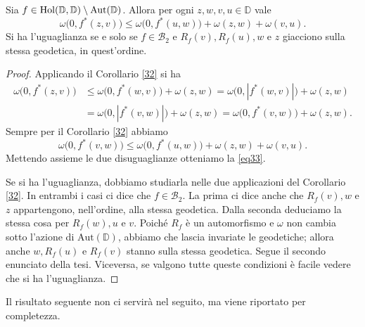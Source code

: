 \begin{cor} \label{33}
  Sia $f \in \text{\normalfont{Hol}}(\mathbb{D},\mathbb{D})\setminus\text{\normalfont{Aut}}(\mathbb{D})$. Allora per ogni $z, w, v, u \in \mathbb{D}$ vale
  \begin{equation} \label{eq33}
    \omega\bigl(0, f^*(z,v)\bigr) \le \omega\bigl(0, f^*(u,w)\bigr)+\omega(z,w)+\omega(v,u).
  \end{equation}
  Si ha l'uguaglianza se e solo se $f \in \mathcal{B}_2$ e $R_f(v), R_f(u), w$ e $z$ giacciono sulla stessa geodetica, in quest'ordine.
\end{cor}
\begin{proof}
  Applicando il Corollario \ref{32} si ha
  \begin{align*}
    \omega\bigl(0,f^*(z,v)\bigr) & \le \omega\bigl(0,f^*(w,v)\bigr)+\omega(z,w) =\omega\bigl(0,|f^*(w,v)|\bigr)+\omega(z,w) \\
    & =\omega\bigl(0,|f^*(v,w)|\bigr)+\omega(z,w)=\omega\bigl(0,f^*(v,w)\bigr)+\omega(z,w).
  \end{align*}
  Sempre per il Corollario \ref{32} abbiamo
  $$\omega\bigl(0,f^*(v,w)\bigr) \le \omega\bigl(0,f^*(u,w)\bigr)+\omega(z,w)+\omega(v,u).$$
  Mettendo assieme le due disuguaglianze otteniamo la \eqref{eq33}.

  Se si ha l'uguaglianza, dobbiamo studiarla nelle due applicazioni del Corollario \ref{32}. In entrambi i casi ci dice che $f \in \mathcal{B}_2$. La prima ci dice anche che $R_f(v), w$ e $z$ appartengono, nell'ordine, alla stessa geodetica. Dalla seconda deduciamo la stessa cosa per $R_f(w), u$ e $v$. Poiché $R_f$ è un automorfismo e $\omega$ non cambia sotto l'azione di $\text{Aut}(\mathbb{D})$, abbiamo che lascia invariate le geodetiche; allora anche $w, R_f(u)$ e $R_f(v)$ stanno sulla stessa geodetica. Segue il secondo enunciato della tesi. Viceversa, se valgono tutte queste condizioni è facile vedere che si ha l'uguaglianza.
\end{proof}

Il risultato seguente non ci servirà nel seguito, ma viene riportato per completezza.

